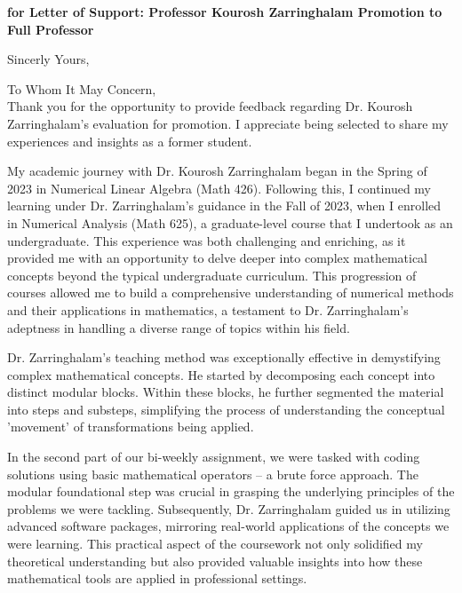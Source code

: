 \documentclass[11pt,a4paper,roman]{moderncv}
\begin{document}
\date{\today}
\opening{\textbf{for Letter of Support: Professor Kourosh Zarringhalam Promotion to Full Professor}}
\closing{Sincerly Yours,\vspace{-1em}}


\makelettertitle



To Whom It May Concern,\\

\vspace{.5cm}
Thank you for the opportunity to provide feedback regarding Dr. Kourosh Zarringhalam's evaluation for promotion. I appreciate being selected to share my experiences and insights as a former student.

\vspace{0.5cm}
My academic journey with Dr. Kourosh Zarringhalam began in the Spring of 2023 in Numerical Linear Algebra (Math 426). Following this, I continued my learning under Dr. Zarringhalam's guidance in the Fall of 2023, when I enrolled in Numerical Analysis (Math 625), a graduate-level course that I undertook as an undergraduate. This experience was both challenging and enriching, as it provided me with an opportunity to delve deeper into complex mathematical concepts beyond the typical undergraduate curriculum. This progression of courses allowed me to build a comprehensive understanding of numerical methods and their applications in mathematics, a testament to Dr. Zarringhalam's adeptness in handling a diverse range of topics within his field.

\vspace{0.5cm}
Dr. Zarringhalam's teaching method was exceptionally effective in demystifying complex mathematical concepts. He started by decomposing each concept into distinct modular blocks. Within these blocks, he further segmented the material into steps and substeps, simplifying the process of understanding the conceptual 'movement' of transformations being applied.

\vspace{0.5cm}
In the second part of our bi-weekly assignment, we were tasked with coding solutions using basic mathematical operators – a brute force approach. The modular foundational step was crucial in grasping the underlying principles of the problems we were tackling. Subsequently, Dr. Zarringhalam guided us in utilizing advanced software packages, mirroring real-world applications of the concepts we were learning. This practical aspect of the coursework not only solidified my theoretical understanding but also provided valuable insights into how these mathematical tools are applied in professional settings.
\end{document}
